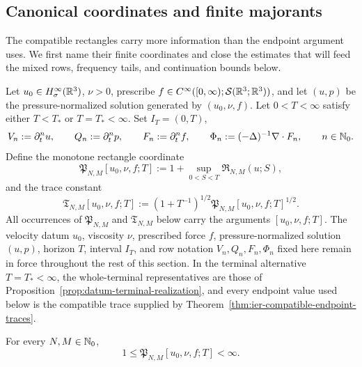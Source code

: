 \subsection{Canonical coordinates and finite majorants}

The compatible rectangles carry more information than the endpoint argument
uses.  We first name their finite coordinates and close the estimates that will
feed the mixed rows, frequency tails, and continuation bounds below.

\begin{definition}
\label{def:qc-producer-constants}
Let \(u_0\in H^\infty_\sigma(\mathbb R^3)\), \(\nu>0\), prescribe
\(f\in C^\infty([0,\infty);\mathcal S(\mathbb R^3;\mathbb R^3))\), and let \((u,p)\) be
the pressure-normalized solution generated by \((u_0,\nu,f)\).  Let
\(0<T<\infty\) satisfy
either \(T<T_*\) or \(T=T_*<\infty\).  Set
\(I_T=(0,T)\),
\[
 V_n:=\partial_t^n u,
 \qquad
 Q_n:=\partial_t^n p,
 \qquad
 F_n:=\partial_t^n f,
 \qquad
 \Phi_n:=(-\Delta)^{-1}\nabla\cdot F_n,
 \qquad n\in\mathbb N_0.
\]
Define the monotone rectangle coordinate
\begin{equation}
 \mathfrak P_{N,M}[u_0,\nu,f;T]
 :=1+\sup_{0<S<T}\mathfrak R_{N,M}(u;S),
 \label{eq:qc-producer-constant}
\end{equation}
and the trace constant
\begin{equation}
 \mathfrak T_{N,M}[u_0,\nu,f;T]
 :=\left(1+T^{-1}\right)^{1/2}
   \mathfrak P_{N,M}[u_0,\nu,f;T]^{1/2}.
 \label{eq:qc-trace-constant}
\end{equation}
All occurrences of \(\mathfrak P_{N,M}\) and \(\mathfrak T_{N,M}\) below
carry the arguments \([u_0,\nu,f;T]\).
The velocity datum \(u_0\), viscosity \(\nu\), prescribed force \(f\),
pressure-normalized solution \((u,p)\), horizon \(T\), interval \(I_T\),
and row notation \(V_n,Q_n,F_n,\Phi_n\) fixed here remain in force
throughout the rest of this section.
In the terminal alternative \(T=T_*<\infty\), the whole-terminal representatives
are those of
Proposition~\ref{prop:datum-terminal-realization}, and every endpoint value
used below is the compatible trace supplied by
Theorem~\ref{thm:ier-compatible-endpoint-traces}.
\end{definition}

\begin{lemma}
\label{lem:qc-producer-finiteness}
For every \(N,M\in\mathbb N_0\),
\begin{equation}
 1\le \mathfrak P_{N,M}[u_0,\nu,f;T]<\infty.
 \label{eq:qc-producer-finiteness}
\end{equation}
\end{lemma}

